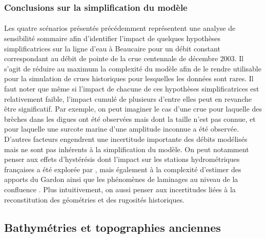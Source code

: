 	\subsubsection{Conclusions sur la simplification du modèle}
	
	\paragraph{} Les quatre scénarios présentés précédemment représentent une analyse de sensibilité sommaire afin d'identifier l'impact de quelques hypothèses simplificatrices sur la ligne d'eau à Beaucaire pour un débit constant correspondant au débit de pointe de la crue centennale de décembre 2003. Il s'agit de réduire au maximum la complexité du modèle afin de le rendre utilisable pour la simulation de crues historiques pour lesquelles les données sont rares. Il faut noter que même si l'impact de chacune de ces hypothèses simplificatrices est relativement faible, l'impact cumulé de plusieurs d'entre elles peut en revanche être significatif. Par exemple, on peut imaginer le cas d'une crue pour laquelle des brèches dans les digues ont été observées mais dont la taille n'est pas connue, et pour laquelle une surcote marine d'une amplitude inconnue a été observée. D'autres facteurs engendrent une incertitude importante des débits modélisés mais ne sont pas inhérents à la simplification du modèle. On peut notamment penser aux effets d'hystérésis dont l'impact sur les stations hydrométriques françaises a été explorée par \cite{perret_framework_2022}, mais également à la complexité d'estimer des apports du Gardon ainsi que les phénomènes de laminages au niveau de la confluence \citep{symadrem_programme_2012}. Plus intuitivement, on aussi penser aux incertitudes liées à la reconstitution des géométries et des rugosités historiques.
	
	\subsection{Bathymétries et topographies anciennes}
	

